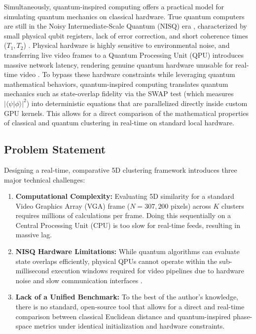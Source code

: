 Simultaneously, quantum-inspired computing offers a practical model for simulating quantum mechanics on classical hardware. True quantum computers are still in the Noisy Intermediate-Scale Quantum (NISQ) era \cite{preskill2018quantum}, characterized by small physical qubit registers, lack of error correction, and short coherence times ($T_1, T_2$) \cite{bharti2022noisy}. Physical hardware is highly sensitive to environmental noise, and transferring live video frames to a Quantum Processing Unit (QPU) introduces massive network latency, rendering genuine quantum hardware unusable for real-time video \cite{fraunhofer2025quantum}. To bypass these hardware constraints while leveraging quantum mathematical behaviors, quantum-inspired computing translates quantum mechanics such as state-overlap fidelity via the SWAP test \cite{buhrman2001quantum} (which measures $|\langle\psi\vert\phi\rangle|^2$) into deterministic equations that are parallelized directly inside custom GPU kernels. This allows for a direct comparison of the mathematical properties of classical and quantum clustering in real-time on standard local hardware.

\subsection{Problem Statement}
Designing a real-time, comparative 5D clustering framework introduces three major technical challenges:
\begin{enumerate}
    \item \textbf{Computational Complexity:} Evaluating 5D similarity for a standard Video Graphics Array (VGA) frame ($N = 307,200$ pixels) across $K$ clusters requires millions of calculations per frame. Doing this sequentially on a Central Processing Unit (CPU) is too slow for real-time feeds, resulting in massive lag.
    \item \textbf{NISQ Hardware Limitations:} While quantum algorithms can evaluate state overlaps efficiently, physical QPUs cannot operate within the sub-millisecond execution windows required for video pipelines due to hardware noise \cite{bharti2022noisy} and slow communication interfaces \cite{fraunhofer2025quantum}.
    \item \textbf{Lack of a Unified Benchmark:} To the best of the author's knowledge, there is no standard, open-source tool that allows for a direct and real-time comparison between classical Euclidean distance \cite{lloyd1982least} and quantum-inspired phase-space metrics under identical initialization and hardware constraints.
\end{enumerate}

